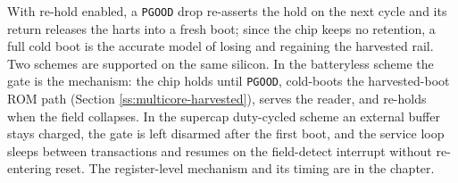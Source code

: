 With re-hold enabled, a \texttt{PGOOD} drop re-asserts the hold on the next cycle and its return releases the harts into a fresh boot; since the chip keeps no retention, a full cold boot is the accurate model of losing and regaining the harvested rail. Two schemes are supported on the same silicon. In the batteryless scheme the gate is the mechanism: the chip holds until \texttt{PGOOD}, cold-boots the harvested-boot ROM path (Section \ref{ss:multicore-harvested}), serves the reader, and re-holds when the field collapses. In the supercap duty-cycled scheme an external buffer stays charged, the gate is left disarmed after the first boot, and the service loop sleeps between transactions and resumes on the field-detect interrupt without re-entering reset. The register-level mechanism and its timing are in the  chapter.
